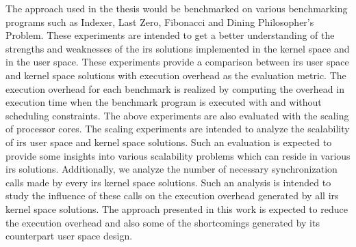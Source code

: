 The approach used in the thesis would be benchmarked on various benchmarking programs such as Indexer, Last Zero, Fibonacci and Dining Philosopher's Problem. 
These experiments are intended to get a better understanding of the strengths and weaknesses of the \acrshort{irs} solutions implemented in the kernel space and in the user space. 
These experiments provide a comparison between \acrshort{irs} user space and kernel space solutions with execution overhead as the evaluation metric. 
The execution overhead for each benchmark is realized by computing the overhead in execution time when the benchmark program is executed with and without scheduling constraints. 
The above experiments are also evaluated with the scaling of processor cores. 
The scaling experiments are intended to analyze the scalability of \acrshort{irs} user space and kernel space solutions. 
Such an evaluation is expected to provide some insights into various scalability problems which can reside in various \acrshort{irs} solutions. 
Additionally, we analyze the number of necessary synchronization calls made by every \acrshort{irs} kernel space solutions. 
Such an analysis is intended to study the influence of these calls on the execution overhead generated by all \acrshort{irs} kernel space solutions. 
The approach presented in this work is expected to reduce the execution overhead and also some of the shortcomings generated by its counterpart user space design. 